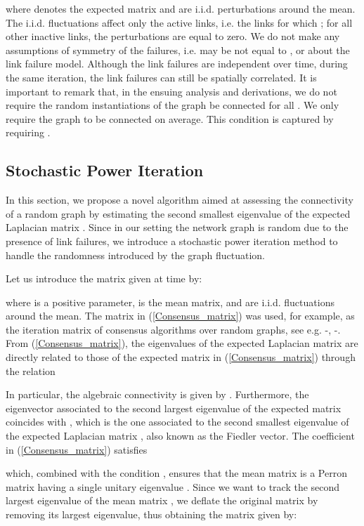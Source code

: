 \documentclass[10pt,twocolumn]{IEEEtran}
\begin{document}
where  denotes the expected matrix and  are i.i.d. perturbations around the mean.
The i.i.d. fluctuations  affect only the active links, i.e. the links for which ; for all other inactive links, the perturbations are equal to zero. We do not make any assumptions of symmetry of the failures, i.e.  may be not equal to , or about the link failure model. Although the link failures are independent over time, during the same iteration, the link failures can still be spatially correlated. It is important to remark that, in the ensuing analysis and derivations, we do not require the random instantiations  of the graph be connected for all . We only require the graph to be connected on average. This condition is captured by requiring .

\subsection{Stochastic Power Iteration}

In this section, we propose a novel algorithm aimed at assessing the connectivity of a random graph by estimating the second smallest eigenvalue of the expected Laplacian matrix . Since in our setting the network graph is random due to the presence of link failures, we introduce a stochastic power iteration method to handle the randomness introduced by the graph fluctuation.

Let us introduce the matrix  given at time  by:

where  is a positive parameter,  is the mean matrix, and  are i.i.d. fluctuations around the mean.
The matrix  in (\ref{Consensus_matrix}) was used, for example, as the iteration matrix of consensus algorithms over random graphs, see e.g. \cite{Tahbaz-Salehi-Jadb1}-\cite{Tahbaz-Salehi-Jadb2}, \cite{Kar-Moura}-\cite{Kar-Moura2}.
From (\ref{Consensus_matrix}), the eigenvalues of the expected Laplacian matrix  are directly related to those of the expected matrix  in (\ref{Consensus_matrix}) through the relation

In particular, the algebraic connectivity is given by . Furthermore, the eigenvector  associated to the second largest eigenvalue of the expected matrix  coincides with  , which is the one associated to the second smallest eigenvalue of the expected Laplacian matrix , also known as the Fiedler vector.
The coefficient  in (\ref{Consensus_matrix}) satisfies

which, combined with the condition , ensures that the mean matrix  is a Perron matrix having a single unitary eigenvalue \cite{Olfati1}. Since we want to track the second largest eigenvalue of the mean matrix , we deflate the original matrix  by removing its largest eigenvalue, thus obtaining the matrix  given by:
\end{document}
